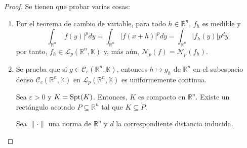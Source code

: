 \documentclass[12pt]{report}
\theoremstyle{largebreak}
\newcommand\abs[1]{\ensuremath{\big|#1\big|}}
\newcommand\norm[1]{\ensuremath{\|#1\|}}
\newcommand{\N}[2]{\ensuremath{\mathcal{N}_{#1}\left(#2\right)}}
\begin{document}
    \begin{proof}
        Se tienen que probar varias cosas:
        \begin{enumerate}
            \item Por el teorema de cambio de variable, para todo $h\in\mathbb{R}^n$, $f_h$ es medible y
            \begin{equation*}
                \int_{\mathbb{R}^n}\abs{f(y)}^pdy=\int_{\mathbb{R}^n}\abs{f(x+h)}^pdy=\int_{\mathbb{R}^n}\abs{f_h(y)}p^dy
            \end{equation*}
            por tanto, $f_h\in\mathcal{L}_p(\mathbb{R}^n,\mathbb{K})$ y, más aún, $\N{p}{f}=\N{p}{f_h}$.
            \item Se prueba que si $g\in\mathcal{C}_c(\mathbb{R}^n,\mathbb{K})$, entonces $h\mapsto g_h$ de $\mathbb{R}^n$ en el subespacio denso $\mathcal{C}_c(\mathbb{R}^n,\mathbb{K})$ en $\mathcal{L}_p(\mathbb{R}^n,\mathbb{K})$ es uniformemente continua.
            
            Sea $\varepsilon>0$ y $K=\textup{Spt}(K)$. Entonces, $K$ es compacto en $\mathbb{R}^n$. Existe un rectángulo acotado $P\subseteq\mathbb{R}^n$ tal que $K\subseteq\mathring{P}$.

            Sea $\norm{\cdot}$ una norma de $\mathbb{R}^n$ y $d$ la correspondiente distancia inducida.


\end{enumerate}
\end{proof}
\end{document}
